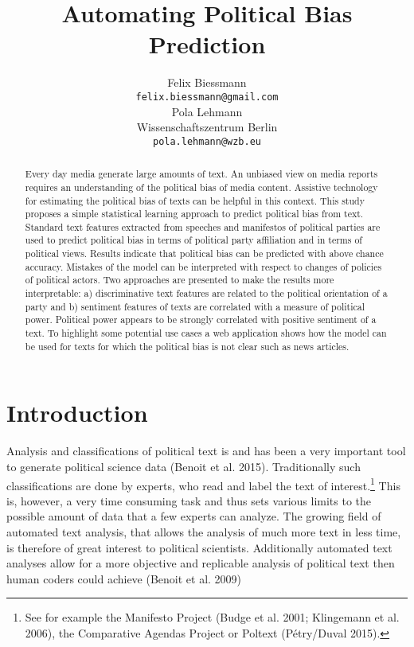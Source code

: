 \documentclass[11pt]{article}
\title{Automating Political Bias Prediction}
\author{Felix Biessmann\\
  {\tt felix.biessmann@gmail.com} \\\And
 Pola Lehmann \\
  Wissenschaftszentrum Berlin \\
  {\tt pola.lehmann@wzb.eu} \\}
\date{}
\begin{document}
\maketitle


\begin{abstract}
Every day media generate large amounts of text. An unbiased view on media reports requires an understanding of the political bias of media content. Assistive technology for estimating the political bias of texts can be helpful in this context. This study proposes a simple statistical learning approach to predict political bias from text. Standard text features extracted from speeches and manifestos of political parties are used to predict political bias in terms of political party affiliation and in terms of political views. Results indicate that political bias can be predicted with above chance accuracy. Mistakes of the model can be interpreted with respect to changes of policies of political actors. Two approaches are presented to make the results more interpretable: a) discriminative text features are related to the political orientation of a party and b) sentiment features of texts are correlated with a measure of political power. Political power appears to be strongly correlated with positive sentiment of a text. To highlight some potential use cases a web application shows how the model can be used for texts for which the political bias is not clear such as news articles.
\end{abstract}

\section{Introduction}
\label{sec:intro}
%
Analysis and classifications of political text is and has been a very important tool to generate political science data (Benoit et al. 2015). Traditionally such classifications are done by experts, who read and label the text of interest.\footnote{See for example the Manifesto Project (Budge et al. 2001; Klingemann et al. 2006), the Comparative Agendas Project or Poltext (Pétry/Duval 2015).} This is, however, a very time consuming task and thus sets various limits to the possible amount of data that a few experts can analyze. The growing field of automated text analysis, that allows the analysis of much more text in less time, is therefore of great interest to political scientists. Additionally automated text analyses allow for a more objective and replicable analysis of political text then human coders could achieve (Benoit et al. 2009)
\end{document}
